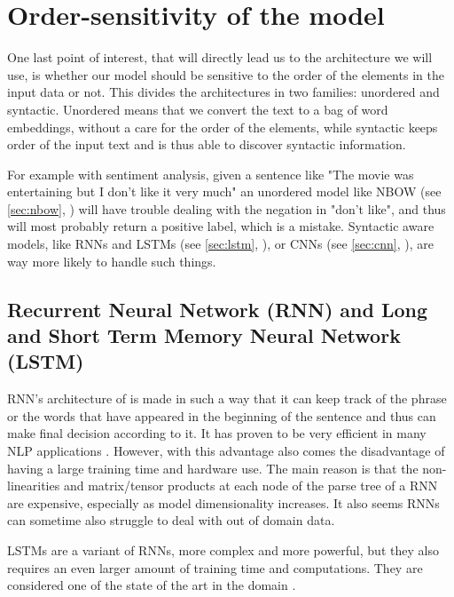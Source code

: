 \section{Order-sensitivity of the model}
One last point of interest, that will directly lead us to the architecture we will use, is whether our model should be sensitive to the order of the elements in the input data or not. This divides the architectures in two families: unordered and syntactic. Unordered means that we convert the text to a bag of word embeddings, without a care for the order of the elements, while syntactic keeps order of the input text and is thus able to discover syntactic information.

For example with sentiment analysis, given a sentence like "The movie was entertaining but I don't like it very much" an unordered model like NBOW (see \autoref{sec:nbow}, ) will have trouble dealing with the negation in "don't like", and thus will most probably return a positive label, which is a mistake. Syntactic aware models, like RNNs and LSTMs (see \autoref{sec:lstm}, ), or CNNs (see \autoref{sec:cnn}, ), are way more likely to handle such things.

\subsection{Recurrent Neural Network (RNN) and Long and Short Term Memory Neural Network (LSTM)\label{sec:lstm}}
RNN’s architecture of is made in such a way that it can keep track of the phrase or the words  that have appeared in the beginning of the sentence and thus can make final decision according to it. It has proven to be very efficient in many NLP applications \cite{rnn_attention_lanl,UnreasonableRNN}.
However, with this advantage also comes the disadvantage of having a large training time and hardware use.
The main reason is that the non-linearities and matrix/tensor products at each node of the parse tree of a RNN are expensive, especially as model dimensionality increases. 
It also seems RNNs can sometime also struggle to deal with out of domain data.

LSTMs are a variant of RNNs, more complex and more powerful, but they also requires an even larger amount of training time and computations.
They are considered one of the state of the art in the domain \cite{LSTM}.

